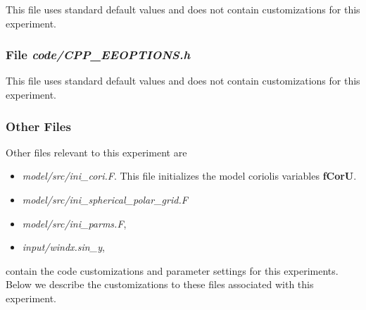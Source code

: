 This file uses standard default values and does not contain
customizations for this experiment.


\subsubsection{File {\it code/CPP\_EEOPTIONS.h}}
\label{www:tutorials}

This file uses standard default values and does not contain
customizations for this experiment.

\subsubsection{Other Files }
\label{www:tutorials}

Other files relevant to this experiment are
\begin{itemize}
\item {\it model/src/ini\_cori.F}. This file initializes the model
coriolis variables {\bf fCorU}.
\item {\it model/src/ini\_spherical\_polar\_grid.F}
\item {\it model/src/ini\_parms.F},
\item {\it input/windx.sin\_y},
\end{itemize}
contain the code customizations and parameter settings for this 
experiments. Below we describe the customizations
to these files associated with this experiment.
